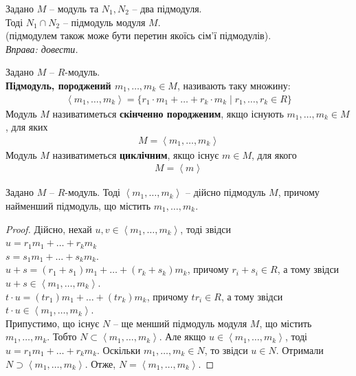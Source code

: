 \documentclass{math_library}
\begin{document}
\begin{proposition}
Задано $M$ -- модуль та $N_1,N_2$ -- два підмодуля.\\
Тоді $N_1 \cap N_2$ -- підмодуль модуля $M$.\\
(підмодулем також може бути перетин якоїсь сім'ї підмодулів).\\
\textit{Вправа: довести.}
\end{proposition}

\begin{definition}
Задано $M$ -- $R$-модуль.\\
\textbf{Підмодуль, породжений $m_1,\dots,m_k \in M$}, називають таку множину:
\begin{align*}
\left< m_1,\dots,m_k \right> = \{ r_1 \cdot m_1 + \dots + r_k \cdot m_k \mid r_1,\dots,r_k \in R \}
\end{align*}
Модуль $M$ називатиметься \textbf{скінченно породженим}, якщо існують $m_1,\dots,m_k \in M$, для яких
\begin{align*}
M = \left< m_1,\dots,m_k \right>
\end{align*}
Модуль $M$ називатиметься \textbf{циклічним}, якщо існує $m \in M$, для якого
\begin{align*}
M = \left< m \right>
\end{align*}
\end{definition}

\begin{proposition}
Задано $M$ -- $R$-модуль. Тоді $\left< m_1,\dots,m_k \right>$ -- дійсно підмодуль $M$, причому найменший підмодуль, що містить $m_1,\dots,m_k$.
\end{proposition}

\begin{proof}
Дійсно, нехай $u,v \in \left< m_1,\dots,m_k\right>$, тоді звідси\\
$u = r_1 m_1 + \dots + r_k m_k$\\
$s = s_1 m_1 + \dots + s_k m_k$.\\
$u + s = (r_1 + s_1)m_1 + \dots + (r_k + s_k)m_k$, причому $r_i + s_i \in R$, а тому звідси $u + s \in \left< m_1,\dots,m_k\right>$.\\
$t \cdot u = (t r_1) m_1 + \dots + (t r_k) m_k$, причому $t r_i \in R$, а тому звідси $t \cdot u \in \left< m_1,\dots,m_k\right>$.
\bigskip \\
Припустимо, що існує $N$ -- ще менший підмодуль модуля $M$, що містить $m_1,\dots,m_k$. Тобто $N \subset \left< m_1,\dots,m_k\right>$. Але якщо $u \in \left< m_1,\dots,m_k\right>$, тоді $u = r_1 m_1 + \dots + r_k m_k$. Оскільки $m_1,\dots,m_k \in N$, то звідси $u \in N$. Отримали $N \supset \left< m_1,\dots,m_k\right>$. Отже, $N = \left< m_1,\dots,m_k\right>$.
\end{proof}
\end{document}
